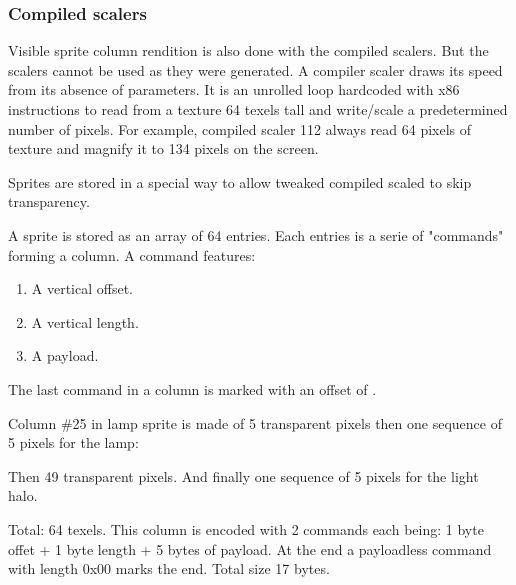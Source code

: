 \subsubsection{Compiled scalers}
Visible sprite column rendition is also done with the compiled scalers. But the scalers cannot be used as they were generated. A compiler scaler draws its speed from its absence of parameters. It is  an unrolled loop hardcoded with x86 instructions to read from a texture 64 texels tall and write/scale a predetermined number of pixels. For example, compiled scaler 112 always read 64 pixels of texture and magnify it to 134 pixels on the screen.\\
\par
Sprites are stored in a special way to allow tweaked compiled scaled to skip transparency.\\
\par
A sprite is stored as an array of 64 entries. Each entries is a serie of "commands" forming a column. A command features:
\begin{enumerate}
 \item A vertical offset.
 \item A vertical length.
 \item A payload.
 \end{enumerate}
\par
The last command in a column is marked with an offset of .\\
\par

\begin{minipage}{.5\textwidth}
 Column \#25 in lamp sprite is made of 5 transparent pixels then one sequence of 5 pixels for the lamp:\\
\par
{}
\par
Then 49 transparent pixels. And finally one sequence of 5 pixels for the light halo.\\
\par
{}
\par
Total: 64 texels. This column is encoded with 2 commands each being: 1 byte offet +  1 byte length + 5 bytes of payload. At the end a payloadless command with length 0x00 marks the end. Total size 17 bytes.\\
 \end{minipage}
\begin{minipage}{.5\textwidth}
\begin{figure}[H]
  \begin{flushright}
   \end{flushright}
\end{figure}
\end{minipage}



